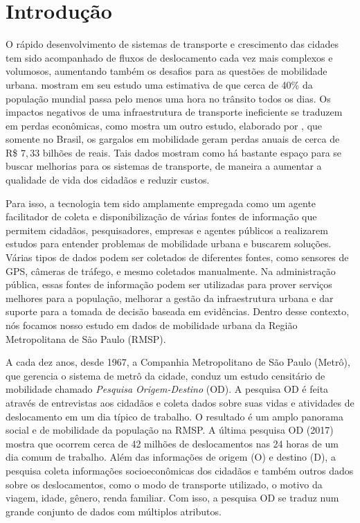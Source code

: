 \chapter{Introdução}
\label{cap:introducao}

O rápido  desenvolvimento de sistemas de transporte e crescimento das cidades
tem sido acompanhado de fluxos de deslocamento cada vez mais complexos e
volumosos, aumentando também os desafios para as questões de mobilidade urbana.
\citet{Zhang2011} mostram em seu estudo uma estimativa de que cerca de 40\% da
população mundial passa pelo menos uma hora no trânsito todos os dias.
Os impactos negativos de uma infraestrutura de transporte
ineficiente se traduzem em perdas econômicas, como mostra um outro estudo,
elaborado por \citet{ricardo:18}, que somente no Brasil, os gargalos em mobilidade geram
perdas anuais de cerca de R\$ $7,33$ bilhões de reais. Tais dados mostram como há
bastante espaço para se buscar melhorias para os sistemas de transporte, de
maneira a aumentar a qualidade de vida dos cidadãos e reduzir custos.

Para isso, a tecnologia tem sido amplamente empregada como um agente
facilitador de coleta e disponibilização de várias fontes de informação que
permitem cidadãos, pesquisadores, empresas e agentes públicos a realizarem
estudos para entender problemas de mobilidade urbana e buscarem soluções.
Várias tipos de dados podem ser coletados de diferentes fontes, como sensores
de GPS, câmeras de tráfego, e mesmo coletados manualmente. Na administração
pública, essas fontes de informação podem ser utilizadas para prover serviços
melhores para a população, melhorar a gestão da infraestrutura urbana e dar
suporte para a tomada de decisão baseada em evidências. Dentro desse
contexto, nós focamos nosso estudo em dados de mobilidade urbana da Região
Metropolitana de S\~ao Paulo (RMSP).

A cada dez anos, desde 1967, a Companhia Metropolitano de São Paulo (Metrô),
que gerencia o sistema de metrô da cidade, conduz um estudo censitário de
mobilidade chamado \emph{Pesquisa Origem-Destino} (OD). A pesquisa OD é feita
através de entrevistas aos cidadãos e coleta dados sobre suas vidas e
atividades de deslocamento em um dia típico de trabalho. O resultado é um amplo
panorama social e de mobilidade da população na RMSP. A última pesquisa OD
(2017) mostra que ocorrem cerca de 42 milhões de deslocamentos nas 24 horas de
um dia comum de trabalho. Além das informações de origem (O) e destino (D), a
pesquisa coleta informações socioeconômicas dos cidadãos e também outros dados
sobre os deslocamentos, como o modo de transporte utilizado, o motivo da
viagem, idade, gênero, renda familiar. Com isso, a pesquisa OD se traduz num
grande conjunto de dados com múltiplos atributos.

